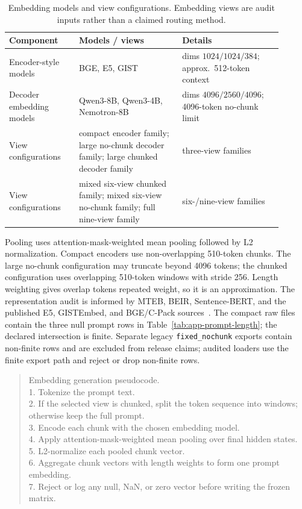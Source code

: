 \documentclass{article}
\begin{document}
\begin{table}[h]
  \caption{Embedding models and view configurations. Embedding views are audit inputs rather than a claimed routing method.}
  \label{tab:app-embedding-views}
  \centering
  \small
  \begin{tabular}{p{0.23\linewidth} p{0.34\linewidth} p{0.33\linewidth}}
    \toprule
    Component & Models / views & Details \\
    \midrule
    Encoder-style models & BGE, E5, GIST & dims $1024/1024/384$; approx.\ 512-token context \\
    Decoder embedding models & Qwen3-8B, Qwen3-4B, Nemotron-8B & dims $4096/2560/4096$; 4096-token no-chunk limit \\
    View configurations & compact encoder family; large no-chunk decoder family; large chunked decoder family & three-view families \\
    View configurations & mixed six-view chunked family; mixed six-view no-chunk family; full nine-view family & six-/nine-view families \\
    \bottomrule
  \end{tabular}
\end{table}

Pooling uses attention-mask-weighted mean pooling followed by L2 normalization. Compact encoders use non-overlapping 510-token chunks. The large no-chunk configuration may truncate beyond 4096 tokens; the chunked configuration uses overlapping 510-token windows with stride 256. Length weighting gives overlap tokens repeated weight, so it is an approximation. The representation audit is informed by MTEB, BEIR, Sentence-BERT, and the published E5, GISTEmbed, and BGE/C-Pack sources~\citep{muennighoff2023mteb, thakur2021beir, reimers2019sentencebert, wang2022e5, solatorio2024gistembed, xiao2024cpack, wang2024improvingembeddings}. The compact raw files contain the three null prompt rows in Table~\ref{tab:app-prompt-length}; the declared intersection is finite. Separate legacy \texttt{fixed\_nochunk} exports contain non-finite rows and are excluded from release claims; audited loaders use the finite export path and reject or drop non-finite rows.

\begin{quote}\footnotesize\ttfamily
Embedding generation pseudocode.\\
1. Tokenize the prompt text.\\
2. If the selected view is chunked, split the token sequence into windows; otherwise keep the full prompt.\\
3. Encode each chunk with the chosen embedding model.\\
4. Apply attention-mask-weighted mean pooling over final hidden states.\\
5. L2-normalize each pooled chunk vector.\\
6. Aggregate chunk vectors with length weights to form one prompt embedding.\\
7. Reject or log any null, NaN, or zero vector before writing the frozen matrix.
\end{quote}
\end{document}
